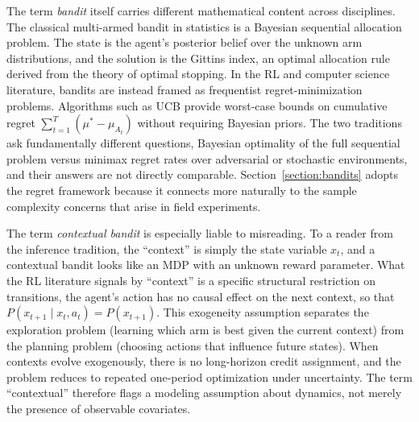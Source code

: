 The term \textit{bandit} itself carries different mathematical content across disciplines. The classical multi-armed bandit in statistics \citep{Thompson1933, Rothschild1974, Gittins1979} is a Bayesian sequential allocation problem. The state is the agent's posterior belief over the unknown arm distributions, and the solution is the Gittins index, an optimal allocation rule derived from the theory of optimal stopping. In the RL and computer science literature, bandits are instead framed as frequentist regret-minimization problems. Algorithms such as UCB provide worst-case bounds on cumulative regret $\sum_{t=1}^T (\mu^* - \mu_{A_t})$ without requiring Bayesian priors. The two traditions ask fundamentally different questions, Bayesian optimality of the full sequential problem versus minimax regret rates over adversarial or stochastic environments, and their answers are not directly comparable. Section~\ref{section:bandits} adopts the regret framework because it connects more naturally to the sample complexity concerns that arise in field experiments.

The term \textit{contextual bandit} is especially liable to misreading. To a reader from the inference tradition, the ``context'' is simply the state variable $x_t$, and a contextual bandit looks like an MDP with an unknown reward parameter. What the RL literature signals by ``context'' is a specific structural restriction on transitions, the agent's action has no causal effect on the next context, so that $P(x_{t+1} \mid x_t, a_t) = P(x_{t+1})$. This exogeneity assumption separates the exploration problem (learning which arm is best given the current context) from the planning problem (choosing actions that influence future states). When contexts evolve exogenously, there is no long-horizon credit assignment, and the problem reduces to repeated one-period optimization under uncertainty. The term ``contextual'' therefore flags a modeling assumption about dynamics, not merely the presence of observable covariates.

